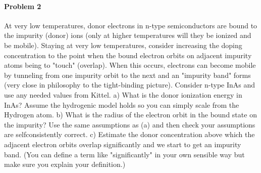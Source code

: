 \documentclass[hyperref, a4paper]{article}
\begin{document}
\paragraph{Problem 2} At very low temperatures, donor electrons in n-type semiconductors are bound to the impurity (donor) ions (only at higher temperatures will they be ionized and be mobile). Staying at very low temperatures, consider increasing the doping concentration to the point when the bound electron orbits on adjacent impurity atoms being to "touch" (overlap). When this occurs, electrons can become mobile by tunneling from one impurity orbit to the next and an "impurity band" forms (very close in philosophy to the tight-binding picture). Consider n-type InAs and use any needed values from Kittel.
a) What is the donor ionization energy in InAs? Assume the hydrogenic model holds so you can simply scale from the Hydrogen atom.
b) What is the radius of the electron orbit in the bound state on the impurity? Use the same assumptions as (a) and then check your assumptions are selfconsistently correct.
c) Estimate the donor concentration above which the adjacent electron orbits overlap significantly and we start to get an impurity band. (You can define a term like "significantly" in your own sensible way but make sure you explain your definition.)
\end{document}
